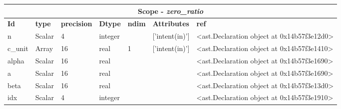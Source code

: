 \documentclass{report}
\begin{document}
 \vspace{1cm}

\begin{center}
\begin{longtable}{|p{3.5cm}|p{1.5cm}|p{1.5cm}|p{1.5cm}|p{1cm}|p{2cm}|p{4cm}| }
\hline
\multicolumn{7}{|c|}{\textbf{Scope} -  \textbf{\textit{zero\_ratio}}} \\ 
\hline
\textbf{Id} & \textbf{type} & \textbf{precision} & \textbf{Dtype} & \textbf{ndim} & \textbf{Attributes} & \textbf{ref} \\\hline

n & Scalar & 4 & integer &  & ['intent(in)'] & <ast.Declaration object at 0x14b57f3e12d0> \\\hline

c\_unit & Array & 16 & real & 1 & ['intent(in)'] & <ast.Declaration object at 0x14b57f3e1410> \\\hline

alpha & Scalar & 16 & real &  &  & <ast.Declaration object at 0x14b57f3e1690> \\\hline

a & Scalar & 16 & real &  &  & <ast.Declaration object at 0x14b57f3e1690> \\\hline

beta & Scalar & 16 & real &  &  & <ast.Declaration object at 0x14b57f3e13d0> \\\hline

idx & Scalar & 4 & integer &  &  & <ast.Declaration object at 0x14b57f3e1910> \\\hline

\end{longtable}
\end{center}

 \vspace{1cm}
\end{document}
